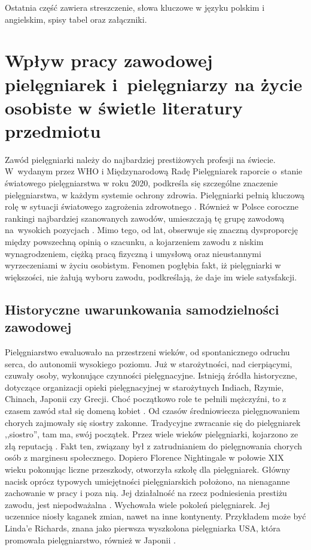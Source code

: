 \documentclass[a4paper,12pt,twoside,openright]{mwrep}
\begin{document}
Ostatnia część zawiera streszczenie, słowa kluczowe w języku polskim i angielskim, spisy tabel oraz załączniki.




\chapter{Wpływ pracy zawodowej pielęgniarek i~pielęgniarzy na życie osobiste w świetle literatury przedmiotu}

Zawód pielęgniarki należy do najbardziej prestiżowych profesji na świecie. W~wydanym przez WHO i Międzynarodową Radę Pielęgniarek raporcie o~stanie światowego pielęgniarstwa w roku 2020, podkreśla się szczególne znaczenie pielęgniarstwa, w każdym systemie ochrony zdrowia. Pielęgniarki pełnią kluczową rolę w sytuacji światowego zagrożenia zdrowotnego \cite{who}.  Również w Polsce coroczne rankingi najbardziej szanowanych zawodów, umieszczają tę grupę zawodową na~wysokich pozycjach \cite{rap}. Mimo tego, od lat, obserwuje się znaczną dysproporcję między powszechną opinią o szacunku, a kojarzeniem zawodu z niskim wynagrodzeniem, ciężką pracą fizyczną i umysłową oraz nieustannymi wyrzeczeniami w życiu osobistym. Fenomen pogłębia fakt, iż pielęgniarki w większości, nie żałują wyboru zawodu, podkreślają, że daje  im wiele satysfakcji.

\section{Historyczne uwarunkowania samodzielności zawodowej}
Pielęgniarstwo ewaluowało na przestrzeni wieków, od spontanicznego odruchu serca, do autonomii wysokiego poziomu. Już w starożytności, nad cierpiącymi, czuwały osoby, wykonujące czynności pielęgnacyjne. Istnieją źródła historyczne, dotyczące organizacji opieki pielęgnacyjnej w starożytnych Indiach, Rzymie, Chinach, Japonii czy Grecji. Choć początkowo role te pełnili mężczyźni, to z czasem zawód stał się domeną kobiet \cite{zro}. Od czasów średniowiecza pielęgnowaniem chorych zajmowały się siostry zakonne. Tradycyjne zwracanie się do pielęgniarek ,,siostro”, tam ma, swój początek. Przez wiele wieków pielęgniarki, kojarzono ze złą reputacją \cite{tlo}. Fakt ten, związany był z zatrudnianiem do pielęgnowania chorych  osób z marginesu społecznego. Dopiero Florence Nightingale w połowie XIX wieku  pokonując liczne przeszkody, otworzyła szkołę dla pielęgniarek. Główny nacisk oprócz typowych umiejętności pielęgniarskich położono, na nienaganne zachowanie w pracy i poza nią. Jej działalność na rzecz podniesienia prestiżu zawodu, jest niepodważalna  \cite{flo}. Wychowała wiele pokoleń pielęgniarek. Jej uczennice niosły kaganek zmian, nawet na inne kontynenty. Przykładem może być Linda'e Richards, znana jako pierwsza wyszkolona pielęgniarka USA, która promowała pielęgniarstwo, również w Japonii \cite{linda}.
\end{document}
